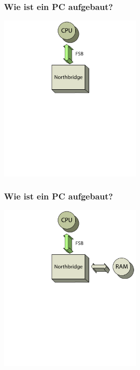 \documentclass{beamer}
\begin{document}
\begin{frame}[t]
\frametitle{Wie ist ein PC aufgebaut?}
\centering
\includegraphics[width=7cm]{architecture3.png}
\end{frame}

\begin{frame}[t]
\frametitle{Wie ist ein PC aufgebaut?}
\centering
\includegraphics[width=7cm]{architecture4.png}
\end{frame}
\end{document}
